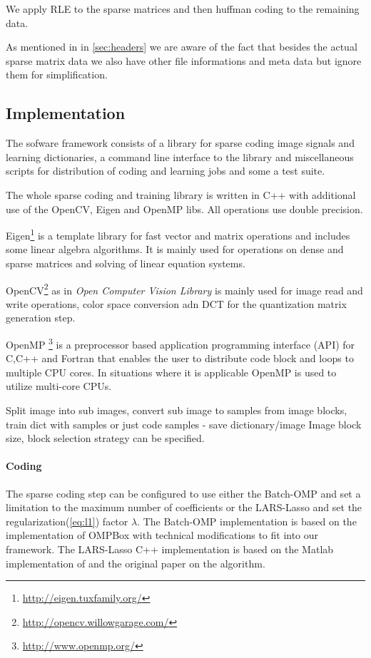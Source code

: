 We apply RLE to the sparse matrices and then huffman coding to the remaining
data.

As mentioned in in \ref{sec:headers} we are aware of the fact that besides
the actual sparse matrix data we also have other file informations and meta
data but ignore them for simplification.
  
\subsection{Implementation}
The sofware framework consists of a library for sparse coding image signals 
and learning dictionaries, a command line interface to the library and
miscellaneous scripts for distribution of coding and learning jobs and
some a test suite.

The whole sparse coding and training library is written in C++ with
additional use of the OpenCV, Eigen and OpenMP libs. All operations use double
precision. 

Eigen\footnote{\url{http://eigen.tuxfamily.org/}\cite{Eigen}}
is a template library for fast vector and matrix operations 
and includes some linear algebra algorithms. It is mainly used for operations on
dense and sparse matrices and solving of linear equation
systems. 

OpenCV\footnote{\url{http://opencv.willowgarage.com/}\cite{OpenCV}} as
in \emph{Open Computer Vision Library} is mainly used for
image read and write operations, color space conversion adn DCT for the
quantization matrix generation step. 

OpenMP \footnote{\url{http://www.openmp.org/}\cite{OpenMP}} is a preprocessor
based application programming interface (API) for C,C++ and Fortran that enables
the user to distribute code block and loops to multiple CPU cores. In situations
where it is applicable OpenMP is used to utilize multi-core CPUs. 

Split image into sub images, convert sub image to samples from image blocks, 
train dict with samples or just code samples - save dictionary/image
Image block size, block selection strategy can be specified.

\paragraph{Coding}
The sparse coding step can be configured to use either the Batch-OMP and 
set a limitation to the maximum number of coefficients or the LARS-Lasso 
and set the regularization(\ref{eq:l1}) factor $\lambda$.
The Batch-OMP implementation is based on the implementation
of \cite{Rubinstein} OMPBox with technical modifications to fit into our
framework. The LARS-Lasso C++ implementation is based on the Matlab
implementation of\cite{Strand2005} and the original
paper\cite{Efron2004} on the algorithm.

